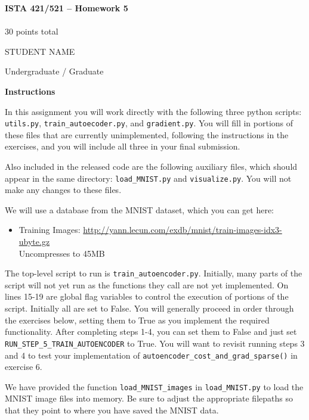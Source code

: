 \documentclass[10pt]{article}
\begin{document}
\begin{center}
    {\Large {\bf ISTA 421/521 -- Homework 5}} \\
     \\
    30 points total
    
\end{center}

\begin{flushright}
STUDENT NAME %

Undergraduate / Graduate %
\end{flushright}

\vspace{1cm}
{\Large {\bf Instructions}}

In this assignment you will work directly with the following three python scripts: {\tt utils.py}, {\tt train\_autoecoder.py}, and {\tt gradient.py}. You will fill in portions of these files that are currently unimplemented, following the instructions in the exercises, and you will include all three in your final submission.

Also included in the released code are the following auxiliary files, which should appear in the same directory: {\tt load\_MNIST.py} and {\tt visualize.py}.  You will not make any changes to these files.

We will use a database from the MNIST dataset, which you can get here:
\begin{itemize}
\item Training Images: \url{http://yann.lecun.com/exdb/mnist/train-images-idx3-ubyte.gz}\\Uncompresses to 45MB
\end{itemize}

The top-level script to run is {\tt train\_autoencoder.py}.  
Initially, many parts of the script will not yet run as the functions they call are not yet implemented.
On lines 15-19 are global flag variables to control the execution of portions of the script.  Initially all are set to False.  You will generally proceed in order through the exercises below, setting them to True as you implement the required functionality.  After completing steps 1-4, you can set them to False and just set {\tt RUN\_STEP\_5\_TRAIN\_AUTOENCODER} to True.  You will want to revisit running steps 3 and 4 to test your implementation of {\tt autoencoder\_cost\_and\_grad\_sparse()} in exercise 6.

We have provided the function {\tt load\_MNIST\_images} in {\tt load\_MNIST.py} to load the MNIST image files into memory.  Be sure to adjust the appropriate filepaths so that they point to where you have saved the MNIST data.
\end{document}
